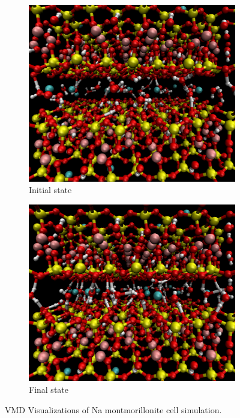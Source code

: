 		\begin{figure}
			\centering
			\begin{subfigure}{0.5\textwidth}
				\centering
				\includegraphics[scale=0.22]{images/na_init.png}
				\caption{Initial state}
			\end{subfigure}%
			\begin{subfigure}{0.5\textwidth}
				\centering
				\includegraphics[scale=0.22]{images/na_fin.png}
				\caption{Final state}
			\end{subfigure}
			\caption{VMD Visualizations of Na montmorillonite cell simulation.}
			\label{fig:na_visual}
		\end{figure}
		
